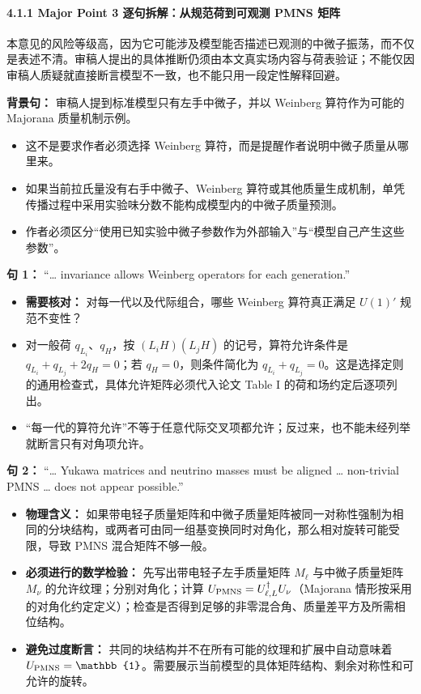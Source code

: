 \documentclass[
  chinese,
  UTF8]{ctexart}
\providecommand{\tightlist}{%
  \setlength{\itemsep}{0pt}\setlength{\parskip}{0pt}}
\begin{document}
\paragraph{4.1.1 Major Point 3 逐句拆解：从规范荷到可观测 PMNS
矩阵}\label{major-point-3-ux9010ux53e5ux62c6ux89e3ux4eceux89c4ux8303ux8377ux5230ux53efux89c2ux6d4b-pmns-ux77e9ux9635}

本意见的风险等级高，因为它可能涉及模型能否描述已观测的中微子振荡，而不仅是表述不清。审稿人提出的具体推断仍须由本文真实场内容与荷表验证；不能仅因审稿人质疑就直接断言模型不一致，也不能只用一段定性解释回避。

\textbf{背景句：} 审稿人提到标准模型只有左手中微子，并以 Weinberg
算符作为可能的 Majorana 质量机制示例。

\begin{itemize}
\tightlist
\item
  这不是要求作者必须选择 Weinberg
  算符，而是提醒作者说明中微子质量从哪里来。
\item
  如果当前拉氏量没有右手中微子、Weinberg
  算符或其他质量生成机制，单凭传播过程中采用实验味分数不能构成模型内的中微子质量预测。
\item
  作者必须区分``使用已知实验中微子参数作为外部输入''与``模型自己产生这些参数''。
\end{itemize}

\textbf{句 1：} ``\ldots{} invariance allows Weinberg operators for each
generation.''

\begin{itemize}
\tightlist
\item
  \textbf{需要核对：} 对每一代以及代际组合，哪些 Weinberg 算符真正满足
  \(U(1)'\) 规范不变性？
\item
  对一般荷 \(q_{L_i}\)、\(q_H\)，按 \((L_iH)(L_jH)\)
  的记号，算符允许条件是 \(q_{L_i}+q_{L_j}+2q_H=0\)；若
  \(q_H=0\)，则条件简化为
  \(q_{L_i}+q_{L_j}=0\)。这是选择定则的通用检查式，具体允许矩阵必须代入论文
  Table I 的荷和场约定后逐项列出。
\item
  ``每一代的算符允许''不等于任意代际交叉项都允许；反过来，也不能未经列举就断言只有对角项允许。
\end{itemize}

\textbf{句 2：} ``\ldots{} Yukawa matrices and neutrino masses must be
aligned \ldots{} non-trivial PMNS \ldots{} does not appear possible.''

\begin{itemize}
\tightlist
\item
  \textbf{物理含义：}
  如果带电轻子质量矩阵和中微子质量矩阵被同一对称性强制为相同的分块结构，或两者可由同一组基变换同时对角化，那么相对旋转可能受限，导致
  PMNS 混合矩阵不够一般。
\item
  \textbf{必须进行的数学检验：} 先写出带电轻子左手质量矩阵 \(M_\ell\)
  与中微子质量矩阵 \(M_\nu\) 的允许纹理；分别对角化；计算
  \(U_{\rm PMNS}=U_{\ell,L}^\dagger U_\nu\)（Majorana
  情形按采用的对角化约定定义）；检查是否得到足够的非零混合角、质量差平方及所需相位结构。
\item
  \textbf{避免过度断言：}
  共同的块结构并不在所有可能的纹理和扩展中自动意味着
  \(U_{\rm PMNS}=\mathbb{1}\)。需要展示当前模型的具体矩阵结构、剩余对称性和可允许的旋转。
\end{itemize}
\end{document}

